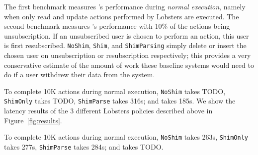 The first benchmark measures \sys{}'s performance during \emph{normal execution}, namely when only
read and update actions performed by Lobsters are executed. 
The second benchmark measures \sys{}'s performance with 10\% of the actions being unsubscription. If
an unsubscribed user is chosen to perform an action, this user is first resubscribed.
\texttt{NoShim}, \texttt{Shim}, and \texttt{ShimParsing} simply delete or insert the chosen user on
unsubscription or resubscription respectively; this provides a very conservative estimate of the
amount of work these baseline systems would need to do if a user withdrew their data from the system.

To complete 10K actions during normal execution, \texttt{NoShim} takes TODO, \texttt{ShimOnly} takes
TODO, \texttt{ShimParse}
takes 316s; and \texttt{\sys{}} takes 185s.
We show the latency results of the 3 different Lobsters policies described above in
Figure~\ref{fig:results}. 

To complete 10K actions during normal execution, \texttt{NoShim} takes 263s, \texttt{ShimOnly} takes 277s, \texttt{ShimParse}
takes 284s; and \texttt{\sys{}} takes TODO.
